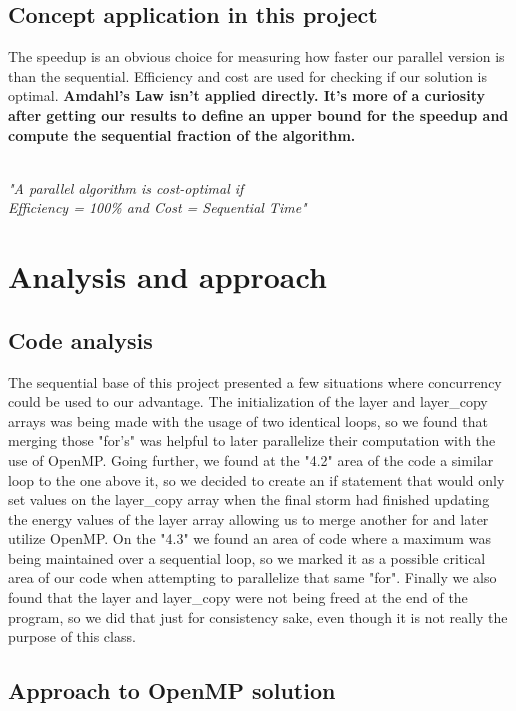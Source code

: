 \documentclass[10pt,journal,compsoc]{IEEEtran}
\begin{document}
\subsection{Concept application in this project}
The speedup is an obvious choice for measuring how faster our parallel version is than the sequential. Efficiency and cost are used for checking if our solution is optimal. \textbf{Amdahl's Law isn't applied directly. It's more of a curiosity after getting our results to define an upper bound for the speedup and compute the sequential fraction of the algorithm.}
\begin{center}
\textit{\\"A parallel algorithm is cost-optimal if\\ Efficiency = 100\% and Cost = Sequential Time"}
\end{center}

\section{Analysis and approach} \label{analysisandapproach}

\subsection{Code analysis}

The sequential base of this project presented a few situations where concurrency could be used to our advantage. The initialization of the layer and layer\_copy arrays was being made with the usage of two identical loops, so we found that merging those "for's" was helpful to later parallelize their computation with the use of OpenMP. Going further, we found at the "4.2" area of the code a similar loop to the one above it, so we decided to create an if statement that would only set values on the layer\_copy array when the final storm had finished updating the energy values of the layer array allowing us to merge another for and later utilize OpenMP. On the "4.3" we found an area of code where a maximum was being maintained over a sequential loop, so we marked it as a possible critical area of our code when attempting to parallelize that same "for". Finally we also found that the layer and layer\_copy were not being freed at the end of the program, so we did that just for consistency sake, even though it is not really the purpose of this class.

\subsection{Approach to OpenMP solution}
\end{document}
